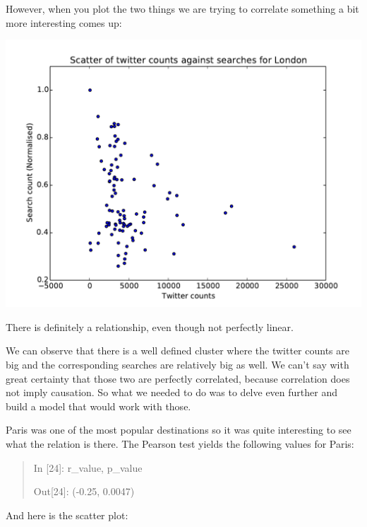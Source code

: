 \documentclass[minf,frontabs,twoside,singlespacing,parskip]{infthesis}
\begin{document}
However, when you plot the two things we are trying to correlate something a bit more interesting comes up:

\includegraphics[width=\textwidth]{London}

There is definitely a relationship, even though not perfectly linear.

We can observe that there is a well defined cluster where the twitter counts are big and the corresponding searches are relatively big as well. We can't say with great certainty that those two are perfectly correlated, because correlation does not imply causation. So what we needed to do was to delve even further and build a model that would work with those.


Paris was one of the most popular destinations so it was quite interesting to see what the relation is there. The Pearson test yields the following values for Paris:
\begin{quotation}
In [24]: r\_value, p\_value

Out[24]: (-0.25, 0.0047)
\end{quotation}
\newpage
And here is the scatter plot:
\end{document}
